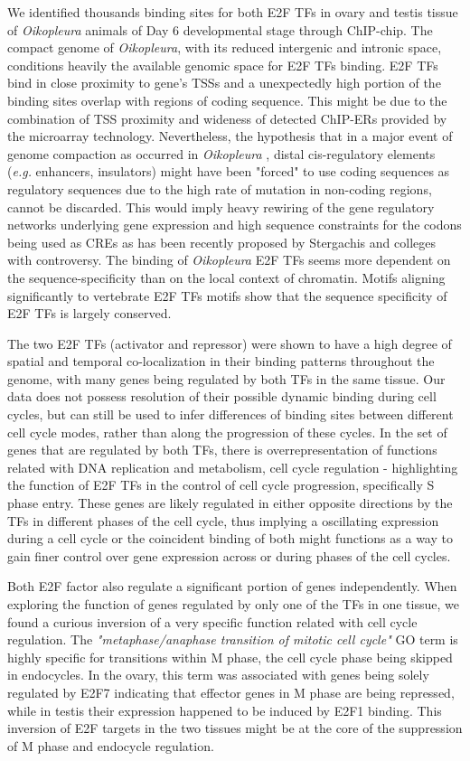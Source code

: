 \documentclass[11pt,twoside,a4paper]{report}
\begin{document}
We identified thousands binding sites for both E2F TFs in ovary and testis tissue of \textit{Oikopleura} animals of Day 6 developmental stage through ChIP-chip. The compact genome of \textit{Oikopleura}, with its reduced intergenic and intronic space, conditions heavily the available genomic space for E2F TFs binding. E2F TFs bind in close proximity to gene's TSSs and a unexpectedly high portion of the binding sites overlap with regions of coding sequence. This might be due to the combination of TSS proximity and wideness of detected ChIP-ERs provided by the microarray technology. Nevertheless, the hypothesis that in a major event of genome compaction as occurred in  \textit{Oikopleura} \cite{Denoeud2010}, distal cis-regulatory elements (\textit{e.g. }enhancers, insulators) might have been "forced" to use coding sequences as regulatory sequences due to the high rate of mutation in non-coding regions, cannot be discarded. This would imply heavy rewiring of the gene regulatory networks underlying gene expression and high sequence constraints for the codons being used as CREs as has been recently proposed by Stergachis and colleges \cite{Stergachis2013} with controversy. The binding of \textit{Oikopleura} E2F TFs seems more dependent on the sequence-specificity than on the local context of chromatin. Motifs aligning significantly to vertebrate E2F TFs motifs show that the sequence specificity of E2F TFs is largely conserved.

The two E2F TFs (activator and repressor) were shown to have a high degree of spatial and temporal co-localization in their binding patterns throughout the genome, with many genes being regulated by both TFs in the same tissue. Our data does not possess resolution of their possible dynamic binding during cell cycles, but can still be used to infer differences of binding sites between different cell cycle modes, rather than along the progression of these cycles. In the set of genes that are regulated by both TFs, there is overrepresentation of functions related with DNA replication and metabolism, cell cycle regulation - highlighting the function of E2F TFs in the control of cell cycle progression, specifically S phase entry. These genes are likely regulated in either opposite directions by the TFs in different phases of the cell cycle, thus implying a oscillating expression during a cell cycle or the coincident binding of both might functions as a way to gain finer control over gene expression across or during phases of the cell cycles.

Both E2F factor also regulate a significant portion of genes independently. When exploring the function of genes regulated by only one of the TFs in one tissue, we found a curious inversion of a very specific function related with cell cycle regulation. The \textit{"metaphase/anaphase transition of mitotic cell cycle"} GO term is highly specific for transitions within M phase, the cell cycle phase being skipped in endocycles. In the ovary, this term was associated with genes being solely regulated by E2F7 indicating that effector genes in M phase are being repressed, while in testis their expression happened to be induced by E2F1 binding. This inversion of E2F targets in the two tissues might be at the core of the suppression of M phase and endocycle regulation. 
\end{document}
